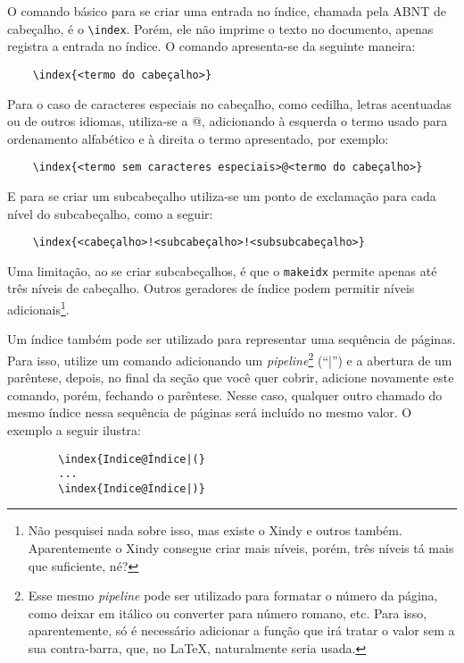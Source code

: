     O comando básico para se criar uma entrada no índice, chamada pela ABNT de cabeçalho, é o \verb|\index|. Porém, ele não imprime o texto no documento, apenas registra a entrada no índice. O comando apresenta-se da seguinte maneira:
\begin{verbatim}
    \index{<termo do cabeçalho>}
\end{verbatim}
    
    Para o caso de caracteres especiais no cabeçalho, como cedilha, letras acentuadas ou de outros idiomas, utiliza-se a @, adicionando à esquerda o termo usado para ordenamento alfabético e à direita o termo apresentado, por exemplo:
\begin{verbatim}
    \index{<termo sem caracteres especiais>@<termo do cabeçalho>}
\end{verbatim}

    E para se criar um subcabeçalho\myIdxSubcabecalho{} utiliza-se um ponto de exclamação para cada nível do subcabeçalho, como a seguir:
\begin{verbatim}
    \index{<cabeçalho>!<subcabeçalho>!<subsubcabeçalho>}
\end{verbatim}
    Uma limitação, ao se criar subcabeçalhos, é que o \texttt{makeidx} permite apenas até três níveis de cabeçalho. Outros geradores de índice podem permitir níveis adicionais\footnote{Não pesquisei nada sobre isso, mas existe o Xindy e outros também. Aparentemente o Xindy consegue criar mais níveis, porém, três níveis tá mais que suficiente, né?}.

    Um índice também pode ser utilizado para representar uma sequência de páginas. Para isso, utilize um comando adicionando um \textit{pipeline}\footnote{Esse mesmo \textit{pipeline} pode ser utilizado para formatar o número da página, como deixar em itálico ou converter para número romano, etc. Para isso, aparentemente, só é necessário adicionar a função que irá tratar o valor sem a sua contra-barra, que, no \LaTeX{}, naturalmente seria usada.} (``|'') e a abertura de um parêntese, depois, no final da seção que você quer cobrir, adicione novamente este comando, porém, fechando o parêntese. Nesse caso, qualquer outro chamado do mesmo índice nessa sequência de páginas será incluído no mesmo valor. O exemplo a seguir ilustra:
    \begin{verbatim}
        \index{Indice@Índice|(}
        ...
        \index{Indice@Índice|)}
    \end{verbatim}
    
